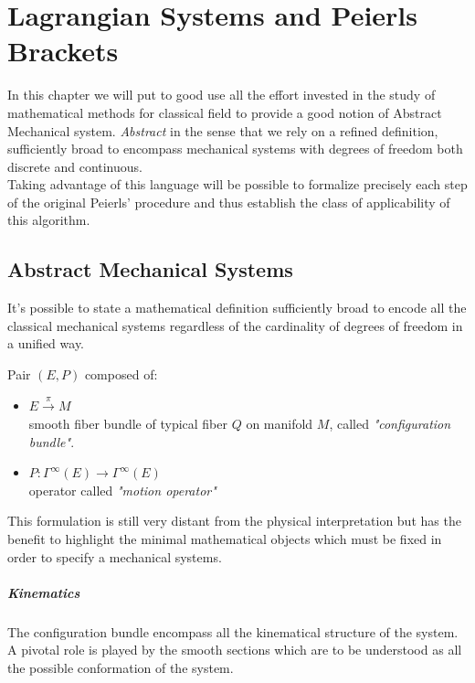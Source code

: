 \documentclass[Main]{subfiles}
\begin{document}
\chapter{Lagrangian Systems and Peierls Brackets}
  In this chapter we will put to good use all the effort invested in the study of mathematical methods for classical field to provide a good notion of Abstract Mechanical system. 
  \emph{Abstract} in the sense that we rely on a refined definition, sufficiently broad to encompass mechanical systems with degrees of freedom both discrete and continuous.
  \\
  Taking advantage of this language  will be possible to formalize precisely each step of the original Peierls' procedure\cite{Peierls1952} and thus establish the class of applicability of this algorithm.
  
	\section{Abstract Mechanical Systems}
	It's possible to state a mathematical definition sufficiently broad to encode all the classical mechanical systems regardless of the cardinality of degrees of freedom  in a unified way.
	
	\begin{definition}
		Pair $(E,P )$ composed of:
		\begin{itemize}
			\item $E \xrightarrow{\pi} M$ \\
			smooth fiber bundle of typical fiber $Q$ on  manifold $M$, called \emph{"configuration bundle"}.
			\item	$ P : \Gamma^\infty(E) \rightarrow \Gamma^\infty(E)$ \\  operator called \emph{"motion operator"}
		\end{itemize}
	\end{definition}
	This formulation is still very distant from the physical interpretation but has the benefit to highlight the minimal mathematical objects which must be fixed in order to specify a mechanical systems.
	
	
	\paragraph{Kinematics}
	The configuration bundle encompass all the kinematical structure of the system.
	 A pivotal role is played by the smooth sections  which are to be understood as all the possible conformation of the system.
\end{document}
